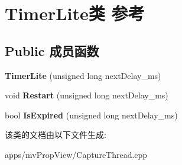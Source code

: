 \hypertarget{class_timer_lite}{\section{Timer\+Lite类 参考}
\label{class_timer_lite}
}
\subsection*{Public 成员函数}
\begin{DoxyCompactItemize}
\item 
\hypertarget{class_timer_lite_a23a26b1fa558c42ab432fc63ebb76d36}{{\bfseries Timer\+Lite} (unsigned long next\+Delay\+\_\+ms)}\label{class_timer_lite_a23a26b1fa558c42ab432fc63ebb76d36}

\item 
\hypertarget{class_timer_lite_ae9a7ec8e4f071a0afd2227e7b0925f30}{void {\bfseries Restart} (unsigned long next\+Delay\+\_\+ms)}\label{class_timer_lite_ae9a7ec8e4f071a0afd2227e7b0925f30}

\item 
\hypertarget{class_timer_lite_a4e147f00346a2f9f3078a4570ba82d77}{bool {\bfseries Is\+Expired} (unsigned long next\+Delay\+\_\+ms)}\label{class_timer_lite_a4e147f00346a2f9f3078a4570ba82d77}

\end{DoxyCompactItemize}


该类的文档由以下文件生成\+:\begin{DoxyCompactItemize}
\item 
apps/mv\+Prop\+View/Capture\+Thread.\+cpp\end{DoxyCompactItemize}

